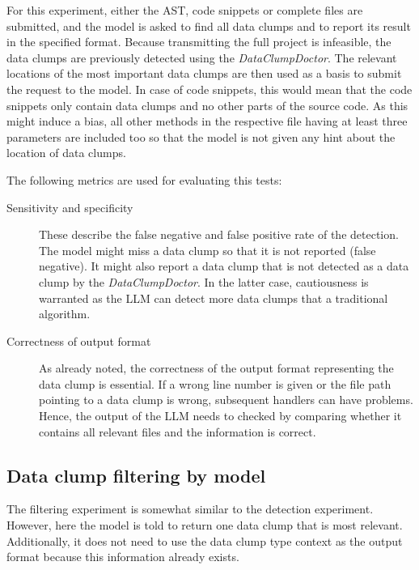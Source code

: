 For this experiment, either the \ac{AST}, code snippets or complete files are submitted, and the model is asked to find all data clumps and to report its result in the specified format.
Because transmitting the full project is infeasible, the data clumps are previously detected using the \textit{DataClumpDoctor}. The relevant locations of the most important data clumps are then used as a basis to submit the request to the model. In case of code snippets, this would mean that the code snippets only contain data clumps and no other parts of the source code. As this might induce a bias, all other methods in the respective file having at least three parameters are included too so that the model is not given any hint about the location of data clumps. 


The following metrics are used for evaluating this tests:

\begin{description}
    \item[Sensitivity and specificity] These describe the false negative and false positive rate of the detection. The model might miss a data clump so that it is not reported (false negative). It might also report  a data clump that is not detected as a data clump by the \textit{DataClumpDoctor}. In the latter case, cautiousness is warranted as the \ac{LLM} can detect more data clumps that a traditional algorithm. 

    \item[Correctness of output format]

    As already noted, the correctness of the output format representing the data clump is essential. If a wrong line number is given or the file path pointing to a data clump is wrong, subsequent handlers can have problems. Hence, the output of the \ac{LLM} needs to checked by comparing whether it contains all relevant files and the information is correct. 
   
\end{description}

\subsection{Data clump filtering by model}
The filtering experiment is somewhat similar to the detection experiment. However, here the model is told to return one data clump that is most relevant. Additionally, it does not need to use the data clump type context as the output format because this information already exists. 

